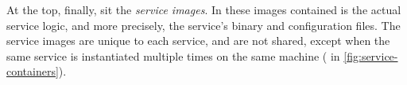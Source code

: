 At the top, finally, sit the \emph{service images}. In these images contained is the actual service logic, and more precisely, the service's binary and configuration files. The service images are unique to each service, and are not shared, except when the same service is instantiated multiple times on the same machine (\cf {} in \autoref{fig:service-containers}).











